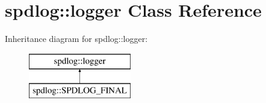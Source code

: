 \hypertarget{classspdlog_1_1logger}{}\section{spdlog\+:\+:logger Class Reference}
\label{classspdlog_1_1logger}
Inheritance diagram for spdlog\+:\+:logger\+:\begin{figure}[H]
\begin{center}
\leavevmode
\includegraphics[height=2.000000cm]{classspdlog_1_1logger}
\end{center}
\end{figure}
